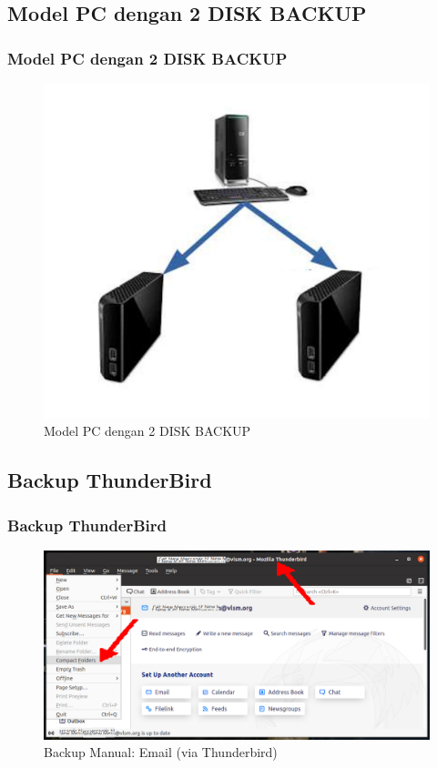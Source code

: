\documentclass[xcolor=table, notheorems, hyperref={pdfpagelabels=false}]{beamer}
\begin{document}
\begin{frame}[fragile]
\section{Model PC dengan 2 DISK BACKUP}
\frametitle{Model PC dengan 2 DISK BACKUP}
\begin{figure}
\includegraphics[width=0.69\linewidth]{PCDISK}
\caption{Model PC dengan 2 DISK BACKUP}
\end{figure}
\end{frame}

\begin{frame}[fragile]
\section{Backup ThunderBird}
\frametitle{Backup ThunderBird}
\begin{figure}
\includegraphics[width=0.91\linewidth]{ThunderBird}
\caption{Backup Manual: Email (via Thunderbird)}
\end{figure}
\end{frame}
\end{document}
